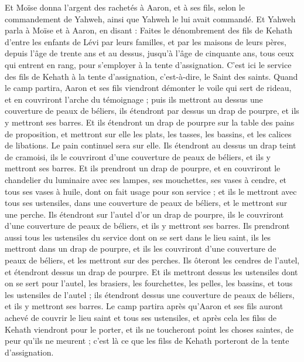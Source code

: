 \begin{multicols}{2}
Et Moïse donna l'argent des rachetés à Aaron, et à ses fils, selon le commandement de Yahweh, ainsi que Yahweh le lui avait commandé.
\VerseOne{}Et Yahweh parla à Moïse et à Aaron, en disant :
Faites le dénombrement des fils de Kehath d'entre les enfants de Lévi par leurs familles, et par les maisons de leurs pères,
depuis l'âge de trente ans et au dessus, jusqu'à l'âge de cinquante ans, tous ceux qui entrent en rang, pour s'employer à la tente d'assignation.
C'est ici le service des fils de Kehath à la tente d'assignation, c'est-à-dire, le Saint des saints.
Quand le camp partira, Aaron et ses fils viendront démonter le voile qui sert de rideau, et en couvriront l'arche du témoignage ;
puis ils mettront au dessus une couverture de peaux de béliers, ils étendront par dessus un drap de pourpre, et ils y mettront ses barres.
Et ils étendront un drap de pourpre sur la table des pains de proposition, et mettront sur elle les plats, les tasses, les bassins, et les calices de libations. Le pain continuel sera sur elle.
Ils étendront au dessus un drap teint de cramoisi, ils le couvriront d'une couverture de peaux de béliers, et ils y mettront ses barres.
Et ils prendront un drap de pourpre, et en couvriront le chandelier du luminaire avec ses lampes, ses mouchettes, ses vases à cendre, et tous ses vases à huile, dont on fait usage pour son service ;
et ils le mettront avec tous ses ustensiles, dans une couverture de peaux de béliers, et le mettront sur une perche.
Ils étendront sur l'autel d'or un drap de pourpre, ils le couvriront d'une couverture de peaux de béliers, et ils y mettront ses barres.
Ils prendront aussi tous les ustensiles du service dont on se sert dans le lieu saint, ils les mettront dans un drap de pourpre, et ils les couvriront d'une couverture de peaux de béliers, et les mettront sur des perches.
Ils ôteront les cendres de l'autel, et étendront dessus un drap de pourpre.
Et ils mettront dessus les ustensiles dont on se sert pour l'autel, les brasiers, les fourchettes, les pelles, les bassins, et tous les ustensiles de l'autel ; ils étendront dessus une couverture de peaux de béliers, et ils y mettront ses barres.
Le camp partira après qu'Aaron et ses fils auront achevé de couvrir le lieu saint et tous ses ustensiles, et après cela les filss de Kehath viendront pour le porter, et ils ne toucheront point les choses saintes, de peur qu'ils ne meurent ; c'est là ce que les filss de Kehath porteront de la tente d'assignation.

\end{multicols}
